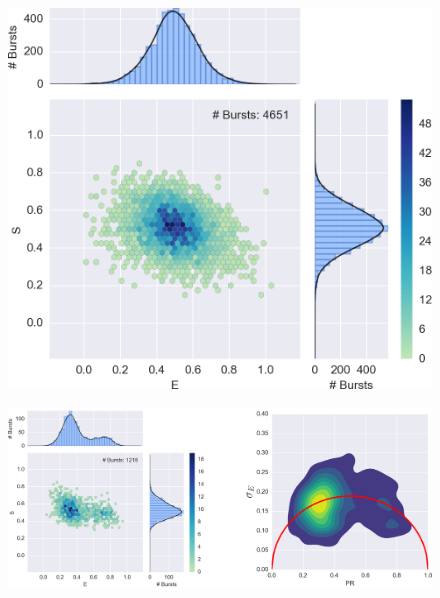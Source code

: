 \begin{figure}
\begin{center}
\includegraphics[width=\singlefig]{"figures/alex_jointplot_fretsel/alex_jointplot_fretsel"}
\caption[]{}
\end{center}
\end{figure}







\begin{figure}
\begin{center}
\includegraphics[width=\doublefig]{"figures/20dA_20dT_200mMMgcl_ALEX_BVA5/20dA_20dT_200mMMgcl_ALEX_BVA5"}
\caption[]{}
\end{center}
\end{figure}

